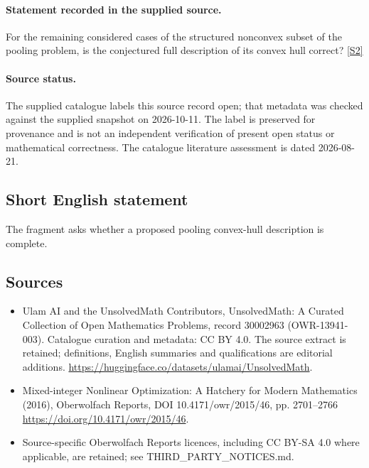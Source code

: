 \documentclass[11pt]{article}
\newcommand{\sref}[2]{\hyperlink{source:#1:#2}{[S#2]}}
\begin{document}
\paragraph{Statement recorded in the supplied source.}
For the remaining considered cases of the structured nonconvex subset of the pooling problem, is the conjectured full description of its convex hull correct? \sref{30002963}{2}
\paragraph{Source status.}
The supplied catalogue labels this source record open; that metadata was checked against the supplied snapshot on 2026-10-11. The label is preserved for provenance and is not an independent verification of present open status or mathematical correctness. The catalogue literature assessment is dated 2026-08-21.
\subsection{Short English statement}
The fragment asks whether a proposed pooling convex-hull description is complete.
\subsection{Sources}
\begin{itemize}
\item[\hypertarget{source:30002963:1}{S1}] Ulam AI and the UnsolvedMath Contributors, UnsolvedMath: A Curated Collection of Open Mathematics Problems, record 30002963 (OWR-13941-003). Catalogue curation and metadata: CC BY 4.0. The source extract is retained; definitions, English summaries and qualifications are editorial additions.
\url{https://huggingface.co/datasets/ulamai/UnsolvedMath}.
\item[\hypertarget{source:30002963:2}{S2}] Mixed-integer Nonlinear Optimization: A Hatchery for Modern Mathematics (2016), Oberwolfach Reports, DOI 10.4171/owr/2015/46, pp. 2701--2766
\url{https://doi.org/10.4171/owr/2015/46}.
\item Source-specific Oberwolfach Reports licences, including CC BY-SA 4.0 where applicable, are retained; see THIRD\_PARTY\_NOTICES.md.
\end{itemize}
\end{document}
